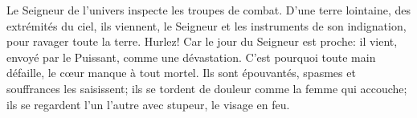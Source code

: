 Le Seigneur de l’univers inspecte les troupes de combat.
D’une terre lointaine, des extrémités du ciel, ils viennent,
	le Seigneur et les instruments de son indignation,
	pour ravager toute la terre.
Hurlez! Car le jour du Seigneur est proche:
	il vient, envoyé par le Puissant, comme une dévastation.
C’est pourquoi toute main défaille, le cœur manque à tout mortel.
	Ils sont épouvantés, spasmes et souffrances les saisissent;
	ils se tordent de douleur comme la femme qui accouche;
	ils se regardent l’un l’autre avec stupeur, le visage en feu.
